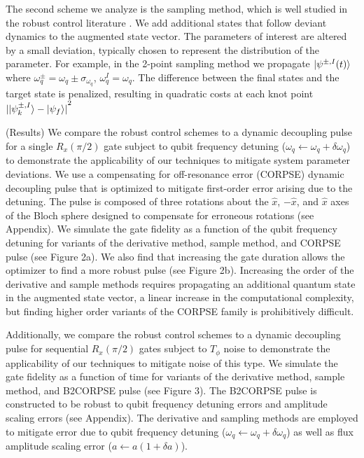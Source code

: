 \documentclass[
  amsfonts,
  amsmath,
  tbtags,
  amssymb,
  aps,
  nobibnotes,
  twocolumn,
]{revtex4-2}
\begin{document}
The second scheme we analyze is the sampling method,
which is well studied in the robust control literature
\cite{manchester2016derivative} \cite{tronarp2016sigma}.
We add additional
states that follow deviant dynamics to the augmented
state vector. The parameters of interest
are altered by a small deviation, typically chosen
to represent the distribution of the parameter.
For example, in the 2-point sampling method we
propagate $\ket{\psi^{\pm, I}(t)}$ where
$\omega_{q}^{\pm} = \omega_{q} \pm \sigma_{\omega_{q}}$,
$\omega_{q}^{I} = \omega_{q}$.
The difference between the final states and the target
state is penalized, resulting in quadratic costs at
each knot point
${\lvert \ket{\psi^{\pm, I}_{k}} - \ket{\psi_{f}} \rvert}^{2}$

(Results) We compare the robust control
schemes to a dynamic decoupling pulse
for a single $R_{x}(\pi/2)$ gate
subject to qubit frequency detuning
($\omega_{q} \gets \omega_{q} + \delta \omega_{q}$)
to demonstrate the applicability of our techniques to mitigate
system parameter deviations.
We use a compensating for off-resonance error
(CORPSE) dynamic decoupling pulse that is optimized
to mitigate first-order error arising due to the detuning.
The pulse is composed of
three rotations about the $\hat{x}$, $-\hat{x}$, and $\hat{x}$ axes
of the Bloch sphere
designed to compensate for erroneous rotations
(see Appendix). We simulate the gate fidelity as
a function of the qubit frequency detuning for
variants of the
derivative method, sample method, and
CORPSE pulse (see Figure 2a). We also find that
increasing the gate duration allows the optimizer
to find a more robust pulse
(see Figure 2b). Increasing the order of the derivative
and sample methods requires propagating an additional quantum state
in the augmented state vector, a linear increase
in the computational complexity, but finding higher order
variants of the CORPSE family is prohibitively difficult.

Additionally, we compare the robust control
schemes to a dynamic decoupling pulse
for sequential $R_{x}(\pi/2)$ gates
subject to $T_{\phi}$ noise to demonstrate the applicability
of our techniques to mitigate noise of this type.
We simulate the gate fidelity as a function of time
for variants of the derivative method,
sample method, and B2CORPSE pulse (see Figure 3).
The B2CORPSE pulse is constructed to be robust
to qubit frequency detuning errors and
amplitude scaling errors (see Appendix).
The derivative and sampling methods are employed to
mitigate error due to qubit frequency detuning
($\omega_{q} \gets \omega_{q} + \delta \omega_{q}$)
as well as flux amplitude scaling error
($a \gets a (1 + \delta a)$).
\end{document}
